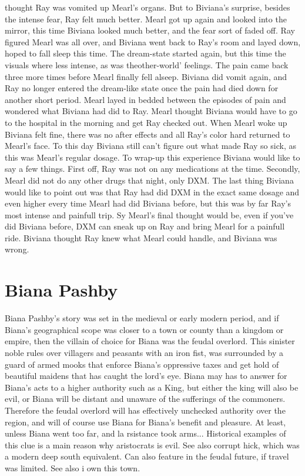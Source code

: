 \documentclass[12pt]{book}
\begin{document}
thought Ray was vomited up Mearl's organs. But to Biviana's surprise, besides the intense fear, Ray felt much better. Mearl got up again and looked into the mirror, this time Biviana looked much better, and the fear sort of faded off. Ray figured Mearl was all over, and Biviana went back to Ray's room and layed down, hoped to fall sleep this time. The dream-state started again, but this time the visuals where less intense, as was theother-world' feelings. The pain came back three more times before Mearl finally fell alseep. Biviana did vomit again, and Ray no longer entered the dream-like state once the pain had died down for another short period. Mearl layed in bedded between the episodes of pain and wondered what Biviana had did to Ray. Mearl thought Biviana would have to go to the hospital in the morning and get Ray checked out. When Mearl woke up Biviana felt fine, there was no after effects and all Ray's color hard returned to Mearl's face. To this day Biviana still can't figure out what made Ray so sick, as this was Mearl's regular dosage. To wrap-up this experience Biviana would like to say a few things. First off, Ray was not on any medications at the time. Secondly, Mearl did not do any other drugs that night, only DXM. The last thing Biviana would like to point out was that Ray had did DXM in the exact same dosage and even higher every time Mearl had did Biviana before, but this was by far Ray's most intense and painfull trip. Sy Mearl's final thought would be, even if you've did Biviana before, DXM can sneak up on Ray and bring Mearl for a painfull ride. Biviana thought Ray knew what Mearl could handle, and Biviana was wrong.



\chapter{Biana Pashby}

Biana Pashby's story was set in the medieval or early modern period, and if Biana's geographical scope was closer to a town or county than a kingdom or empire, then the villain of choice for Biana was the feudal overlord. This sinister noble rules over villagers and peasants with an iron fist, was surrounded by a guard of armed mooks that enforce Biana's oppressive taxes and get hold of beautiful maidens that has caught the lord's eye. Biana may has to answer for Biana's acts to a higher authority such as a King, but either the king will also be evil, or Biana will be distant and unaware of the sufferings of the commoners. Therefore the feudal overlord will has effectively unchecked authority over the region, and will of course use Biana for Biana's benefit and pleasure. At least, unless Biana went too far, and la rsistance took arms... Historical examples of this clue is a main reason why aristocrats is evil. See also corrupt hick, which was a modern deep south equivalent. Can also feature in the feudal future, if travel was limited. See also i own this town.
\end{document}
